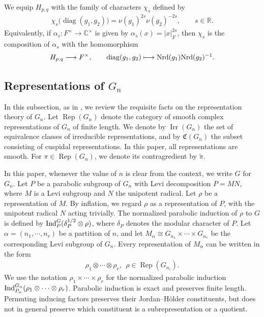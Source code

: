 \documentclass[11pt,leqno]{amsart}
\numberwithin{equation}{section}
\theoremstyle{plain}
\theoremstyle{definition}
\theoremstyle{remark}
\DeclareMathOperator{\Irr}{Irr}
\DeclareMathOperator{\Rep}{Rep}
\begin{document}
	We equip $H_{p,q}$ with the family of characters
	$\chi_s$ defined by
	\begin{align*}
		\chi_s\bigl(\operatorname{diag}(g_1,g_2)\bigr)=\nu(g_1)^{2s}\nu(g_2)^{-2s}, \qquad s \in \mathbb R.
	\end{align*}
	Equivalently, if $\alpha_s:F^\times\to\mathbb C^\times$
	is given by $\alpha_s(x)=|x|_F^{2s}$, then $\chi_s$ is
	the composition of $\alpha_s$ with the homomorphism
	\begin{align*}
		H_{p,q}\longrightarrow F^\times,
		\qquad
		\operatorname{diag}(g_1,g_2)
		\longmapsto
		{\rm Nrd}(g_1){\rm Nrd}(g_2)^{-1}.
	\end{align*}
	\subsection{Representations of $G_n$}
	In this subsection, as in \cite{BZ}, we review the requisite facts on the representation theory of ${G}_n$. 
	Let ${\Rep}({G}_n)$ denote the category of smooth complex representations of ${G}_n$ of finite length.
	We denote by ${\Irr}({G}_n)$ the set of equivalence classes of irreducible representations, and by $\mathfrak{C}(G_n)$ the subset consisting of cuspidal representations. 
	In this paper, all representations are smooth. 
	For $\pi \in {\Rep}(G_n)$, we denote its contragredient by $\widetilde{\pi}$.
	
	In this paper, whenever the value of $n$ is clear from the context, we write ${G}$ for ${G}_n$.
	Let $P$ be a parabolic subgroup of ${G}_n$ with Levi decomposition $P=MN$, where $M$ is a Levi subgroup and $N$ the unipotent radical.
	Let $\rho$ be a representation of $M$. By inflation, we regard 
	$\rho$ as a representation of $P$, with the unipotent radical 
	$N$ acting trivially. 
	The normalized parabolic induction of $\rho$ to $G$ is defined by
	${\rm Ind}_P^G(\delta_P^{1/2}\otimes \rho)$, where $\delta_P$ denotes the modular character of $P$.
	Let $\alpha=(n_1,\cdots, n_r)$ be a partition of $n$, and let $M_\alpha\cong G_{n_1} \times \cdots \times G_{n_r}$ be the corresponding Levi subgroup of $G_n$.
	Every representation of $M_\alpha$ can be written in the form
	\begin{align*}
		\rho_1\otimes \cdots \otimes \rho_r,  \ \  \rho \in \Rep(G_{n_i}).
	\end{align*}
	We use the notation $\rho_1\times \cdots \times \rho_r$ for the normalized parabolic induction ${\rm Ind}_{P_\alpha}^{G_n}(\rho_1\otimes \cdots \otimes \rho_r)$.
	Parabolic induction is exact and preserves finite length.
	Permuting inducing factors preserves their Jordan--H\"older constituents,
	but does not in general preserve which constituent is a subrepresentation
	or a quotient.
	
\end{document}
